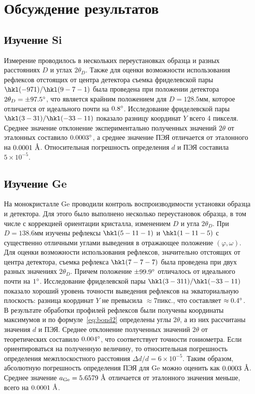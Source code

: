 \section{Обсуждение результатов}
\subsection{Изучение Si}
Измерение проводилось в нескольких переустановках образца и разных расстояниях $D$ и углах $2\theta_D$.
Также для оценки возможности использования рефлексов отстоящих от центра детектора съемка фриделевской пары $\hkl(-9 7 1)/\hkl(9 -7 -1)$ была проведена при положении детектора $2\theta_D = \pm 97.5^\circ$, что является крайним положением для $D = 128.5\unit{мм}$, которое отличается от идеального почти на $0.8^\circ$.
Исследование фриделевской пары $\hkl(3 -3 1)/\hkl(-3 3 -11)$ показало разницу координат $Y$ всего 4 пикселя.
Среднее значение отклонение экспериментально полученных значений $2\theta$ от эталонных составило $0.0003^\circ$, а среднее значение ПЭЯ отличается от эталонного на $0.0001\ \text{\AA}$.
Относительная погрешность определения $d$ и ПЭЯ составила $5 \times 10^{-5}$.
\subsection{Изучение Ge}
На монокристалле Ge проводили контроль воспроизводимости установки образца и детектора.
Для этого было выполнено несколько переустановок образца, в том числе с коррекцией ориентации кристалла, изменением $D$ и угла $2\theta_D$.
При $D = 138.6\unit{мм}$ изучены рефлексы $\hkl(5 -11 -1)$ и $\hkl(1 -11 -5)$ с существенно отличными углами выведения в отражающее положение $(\varphi, \omega)$.
Для оценки возможности использования рефлексов, значительно отстоящих от центра детектора, съемка рефлекса $\hkl(7 -7 -7)$ была проведена при двух разных значениях $2\theta_D$.
Причем положение $\pm 99.9^\circ$ отличалось от идеального почти на $1^\circ$.
Исследование фриделевской пары $\hkl(3 -3 11)/\hkl(-3 3 -11)$ показало хороший уровень точности выведения рефлексов на экваториальную плоскость: разница координат $Y$ не превысила $\approx 7\unit{пикс.}$, что составляет $\approx 0.4^\circ$.
В результате обработки профилей рефлексов были получены координаты максимумов и по формуле~\ref{eq:bond2} определены углы $2\theta$, а из них рассчитаны значения $d$ и ПЭЯ.
Среднее отклонение полученных значений $2\theta$ от теоретических составило $0.004^\circ$, что соответствует точности гониометра.
Если ориентироваться на полученную величину, то относительная погрешность определения межплоскостного расстояния $\Delta d / d = 6 \times 10^{-5}$.
Таким образом, абсолютную погрешность определения ПЭЯ для Ge можно оценить как $0.0003\ \text{\AA}$.
Среднее значение $a_\text{Ge} = 5.6579\ \text{\AA}$ отличается от эталонного значения меньше, всего на $0.0001\ \text{\AA}$.
